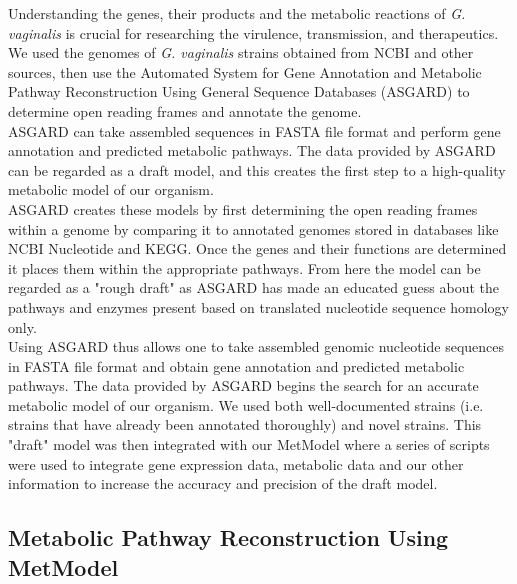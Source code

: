 \indent\indent Understanding the genes, their products and the metabolic reactions of \textit{G. vaginalis} is crucial for researching the virulence, transmission, and therapeutics.  We used the genomes of \textit{G. vaginalis} strains obtained from NCBI and other sources, then use the Automated System for Gene Annotation and Metabolic Pathway Reconstruction Using General Sequence Databases (ASGARD) to determine open reading frames and annotate the genome\citep{alves_automated_2007}. \\
\indent ASGARD can take assembled sequences in FASTA file format and perform gene annotation and predicted metabolic pathways. The data provided by ASGARD can be regarded as a draft model, and this creates the first step to a high-quality metabolic model of our organism. \\
\indent ASGARD creates these models by first determining the open reading frames within a genome by comparing it to annotated genomes stored in databases like NCBI Nucleotide and KEGG.  Once the genes and their functions are determined it places them within the appropriate pathways. From here the model can be regarded as a "rough draft" as ASGARD has made an educated guess about the pathways and enzymes present based on translated nucleotide sequence homology only. \\
\indent Using ASGARD thus allows one to take assembled genomic nucleotide sequences in FASTA file format and obtain gene annotation and predicted metabolic pathways. The data provided by ASGARD begins the search for an accurate metabolic model of our organism. We used both well-documented strains (i.e. strains that have already been annotated thoroughly) and novel strains. This "draft" model was then integrated with our MetModel where a series of scripts were used to integrate gene expression data, metabolic data and our other information to increase the accuracy and precision of the draft model.\\

\subsection{Metabolic Pathway Reconstruction Using MetModel}

